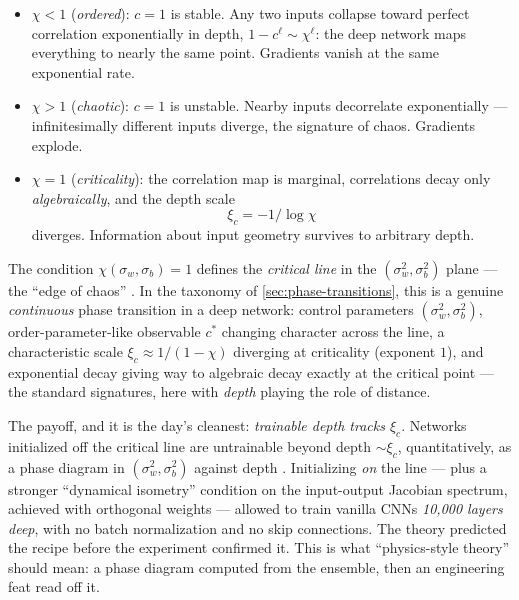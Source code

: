 \documentclass[11pt]{article}
\begin{document}
\begin{itemize}
  \item $\chi < 1$ (\emph{ordered}): $c = 1$ is stable. Any two inputs
  collapse toward perfect correlation exponentially in depth,
  $1 - c^\ell \sim \chi^{\ell}$: the deep network maps everything to nearly
  the same point. Gradients vanish at the same exponential rate.
  \item $\chi > 1$ (\emph{chaotic}): $c = 1$ is unstable. Nearby inputs
  decorrelate exponentially --- infinitesimally different inputs diverge, the
  signature of chaos. Gradients explode.
  \item $\chi = 1$ (\emph{criticality}): the correlation map is marginal,
  correlations decay only \emph{algebraically}, and the depth scale
  \begin{equation}
    \xi_c = -1/\log \chi
  \end{equation}
  diverges. Information about input geometry survives to arbitrary depth.
\end{itemize}
The condition $\chi(\sigma_w, \sigma_b) = 1$ defines the \emph{critical
line} in the $(\sigma_w^2, \sigma_b^2)$ plane --- the ``edge of chaos''
\cite{poole2016exponential,schoenholz2017deep}. In the taxonomy of
\cref{sec:phase-transitions}, this is a genuine \emph{continuous} phase
transition in a deep network: control parameters $(\sigma_w^2,
\sigma_b^2)$, order-parameter-like observable $c^*$ changing character
across the line, a characteristic scale $\xi_c \approx 1/(1 - \chi)$
diverging at criticality (exponent $1$), and exponential decay giving way
to algebraic decay exactly at the critical point --- the standard
signatures, here with \emph{depth} playing the role of distance.

\begin{callout}[tip]
The payoff, and it is the day's cleanest: \emph{trainable depth tracks
$\xi_c$}. Networks initialized off the critical line are untrainable beyond
depth $\sim \xi_c$, quantitatively, as a phase diagram in
$(\sigma_w^2, \sigma_b^2)$ against depth \cite{schoenholz2017deep}.
Initializing \emph{on} the line --- plus a stronger ``dynamical isometry''
condition on the input-output Jacobian spectrum, achieved with orthogonal
weights --- allowed \cite{xiao2018dynamical} to train vanilla CNNs
\emph{10{,}000 layers deep}, with no batch normalization and no skip
connections. The theory predicted the recipe before the experiment
confirmed it. This is what ``physics-style theory'' should mean: a phase
diagram computed from the ensemble, then an engineering feat read off it.
\end{callout}
\end{document}
